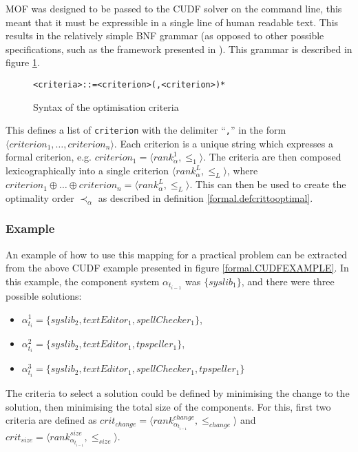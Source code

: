 MOF was designed to be passed to the CUDF solver on the command line, this meant that it must be expressible in a single line of human readable text.
This results in the relatively simple BNF grammar (as opposed to other possible specifications, such as the framework presented in \citep{Treinen2009}). 
This grammar is described in figure \ref{formal.optbnf}.
\begin{figure}[h!]
\begin{center}
\begin{alltt}
<criteria> ::= <criterion> (, <criterion>)*
\end{alltt}
  \caption{Syntax of the optimisation criteria}
  \label{formal.optbnf}
\end{center}
\end{figure}
This defines a list of \verb+criterion+ with the delimiter ``\verb+,+'' in the form $\langle criterion_1, \ldots, criterion_n \rangle$.
Each criterion is a unique string which expresses a formal criterion, e.g. $criterion_1 = \langle rank^1_{\alpha}, \leq_1 \rangle$.
The criteria are then composed lexicographically into a single criterion $\langle  rank^L_{\alpha}, \leq_L \rangle$, 
where $criterion_1 \oplus \ldots \oplus criterion_n = \langle  rank^L_{\alpha}, \leq_L \rangle$. 
This can then be used to create the optimality order $\prec_{\alpha}$ as described in definition \ref{formal.defcrittooptimal}.

\subsubsection{Example}
An example of how to use this mapping for a practical problem can be extracted from the above CUDF example presented in figure \ref{formal.CUDFEXAMPLE}.
In this example, the component system $\alpha_{t_{i-1}}$ was  $\{syslib_1\}$, and there were three possible solutions:
\begin{itemize}
  \item $\alpha_{t_i}^1 = \{syslib_2, textEditor_1, spellChecker_1\}$,
  \item $\alpha_{t_i}^2 = \{syslib_2, textEditor_1, tpspeller_1\}$,
  \item $\alpha_{t_i}^3 = \{syslib_2, textEditor_1, spellChecker_1, tpspeller_1\}$
\end{itemize}

The criteria to select a solution could be defined by minimising the change to the solution, then minimising the total size of the components.
For this, first two criteria are defined as $crit_{change} = \langle rank^{change}_{\alpha_{t_{i-1}}}, \leq_{change} \rangle$ and $crit_{size} = \langle rank^{size}_{\alpha_{t_{i-1}}}, \leq_{size} \rangle$.

